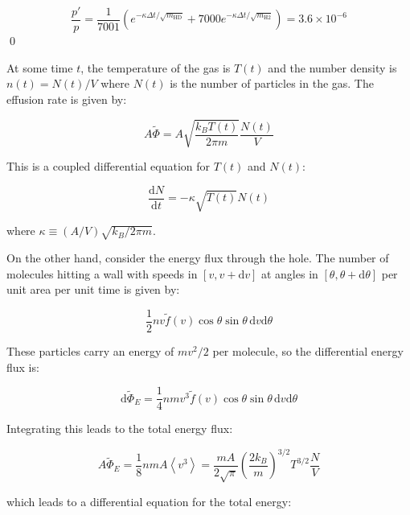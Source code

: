 \documentclass[12pt]{article}
\begin{document}
\begin{equation}
    \frac{p'}{p} = \frac{1}{7001} \left( e^{-\kappa \Delta t/\sqrt{m_{\text{HD}}}} + 7000 e^{-\kappa \Delta t/\sqrt{m_{\text{H2}}}} \right) = 3.6 \times 10^{-6}
\end{equation}
\qed


At some time $t$, the temperature of the gas is $T(t)$ and the number density is $n(t) = N(t)/V$ where $N(t)$ is the number of particles in the gas. The effusion rate is given by:

\begin{equation}
    A\tilde{\Phi} = A \sqrt{\frac{k_{B}T(t)}{2\pi m}} \frac{N(t)}{V}
\end{equation}

This is a coupled differential equation for $T(t)$ and $N(t)$:

\begin{equation}
    \frac{\mathrm{d}N}{\mathrm{d}t} = -\kappa \sqrt{T(t)} N(t)
\end{equation}

where $\kappa \equiv (A/V) \sqrt{k_{B}/2\pi m}$.

On the other hand, consider the energy flux through the hole. The number of molecules hitting a wall with speeds in $[v, v + \mathrm{d}v]$ at angles in $[\theta, \theta + \mathrm{d}\theta]$ per unit area per unit time is given by:

\begin{equation}
    \frac{1}{2} nv \tilde{f}(v) \cos{\theta} \sin{\theta} \, \mathrm{d}v \mathrm{d}\theta
\end{equation}

These particles carry an energy of $mv^{2}/2$ per molecule, so the differential energy flux is:

\begin{equation}
    \mathrm{d}\tilde{\Phi}_{E} = \frac{1}{4} nmv^{3} \tilde{f}(v) \cos{\theta} \sin{\theta} \, \mathrm{d}v \mathrm{d}\theta
\end{equation}

Integrating this leads to the total energy flux:

\begin{equation}
    A\tilde{\Phi}_{E} = \frac{1}{8} nmA \left\langle v^{3} \right\rangle = \frac{mA}{2\sqrt{\pi}} \left( \frac{2k_{B}}{m} \right)^{3/2} T^{3/2} \frac{N}{V}
\end{equation}

which leads to a differential equation for the total energy:
\end{document}
